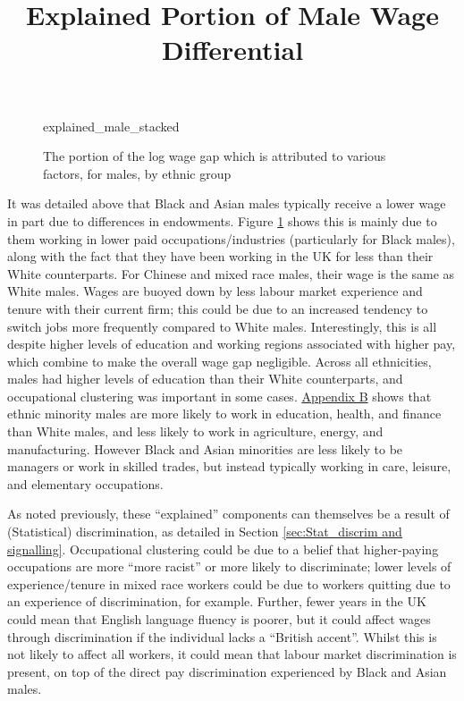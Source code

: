 \documentclass[class=article, crop=false]{standalone}
\begin{document}
\begin{figure}[h]
\centering
    \title{Explained Portion of Male Wage Differential}
    {explained_male_stacked}
    \caption{The portion of the log wage gap which is attributed to various factors, for males, by ethnic group}
    \label{fig:explained_male_stacked}
\end{figure}

It was detailed above that Black and Asian males typically receive a lower wage in part due to differences in endowments. Figure \ref{fig:explained_male_stacked} shows this is mainly due to them working in lower paid occupations/industries (particularly for Black males), along with the fact that they have been working in the UK for less than their White counterparts. For Chinese and mixed race males, their wage is the same as White males. Wages are buoyed down by less labour market experience and tenure with their current firm; this could be due to an increased tendency to switch jobs more frequently compared to White males. Interestingly, this is all despite higher levels of education and working regions associated with higher pay, which combine to make the overall wage gap negligible. Across all ethnicities, males had higher levels of education than their White counterparts, and occupational clustering was important in some cases. \hyperref[sec:appendixB]{Appendix B} shows that ethnic minority males are more likely to work in education, health, and finance than White males, and less likely to work in agriculture, energy, and manufacturing. However Black and Asian minorities are less likely to be managers or work in skilled trades, but instead typically working in care, leisure, and elementary occupations.

As noted previously, these \enquote{explained} components can themselves be a result of (Statistical) discrimination, as detailed in Section \ref{sec:Stat_discrim and signalling}. Occupational clustering could be due to a belief that higher-paying occupations are more \enquote{more racist} or more likely to discriminate; lower levels of experience/tenure in mixed race workers could be due to workers quitting due to an experience of discrimination, for example. Further, fewer years in the UK could mean that English language fluency is poorer, but it could affect wages through discrimination if the individual lacks a \enquote{British accent}. Whilst this is not likely to affect all workers, it could mean that labour market discrimination is present, on top of the direct pay discrimination experienced by Black and Asian males.
\end{document}
